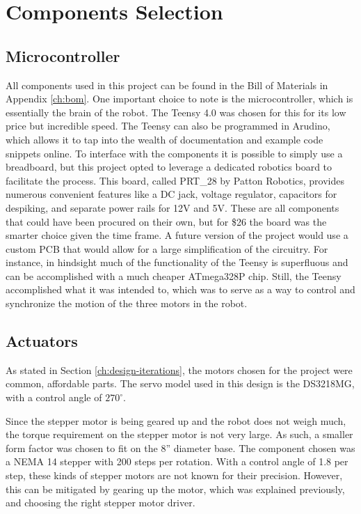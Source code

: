 \section{Components Selection}
\subsection{Microcontroller}
All components used in this project can be found in the Bill of Materials in Appendix \ref{ch:bom}. One important choice to note is the microcontroller, which is essentially the brain of the robot. The Teensy 4.0 was chosen for this for its low price but incredible speed. The Teensy can also be programmed in Arudino, which allows it to tap into the wealth of documentation and example code snippets online. To interface with the components it is possible to simply use a breadboard, but this project opted to leverage a dedicated robotics board to facilitate the process. This board, called PRT\_28 by Patton Robotics, provides numerous convenient features like a DC jack, voltage regulator, capacitors for despiking, and separate power rails for 12V and 5V. These are all components that could have been procured on their own, but for \$26 the board was the smarter choice given the time frame. A future version of the project would use a custom PCB that would allow for a large simplification of the circuitry. For instance, in hindsight much of the functionality of the Teensy is superfluous and can be accomplished with a much cheaper ATmega328P chip. Still, the Teensy accomplished what it was intended to, which was to serve as a way to control and synchronize the motion of the three motors in the robot.

\subsection{Actuators}
As stated in Section \ref{ch:design-iterations}, the motors chosen for the project were common, affordable parts. The servo model used in this design is the DS3218MG, with a control angle of $270^\circ$. 

Since the stepper motor is being geared up and the robot does not weigh much, the torque requirement on the stepper motor is not very large. As such, a smaller form factor was chosen to fit on the 8'' diameter base. The component chosen was a NEMA 14 stepper with 200 steps per rotation. With a control angle of 1.8 per step, these kinds of stepper motors are not known for their precision. However, this can be mitigated by gearing up the motor, which was explained previously, and choosing the right stepper motor driver.

